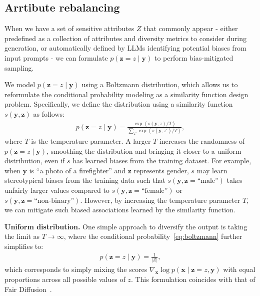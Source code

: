 \subsection{Arrtibute rebalancing}
\label{sec:attribute_rebalancing}
When we have a set of sensitive attributes $Z$ that commonly appear - either predefined as a collection of attributes and diversity metrics to consider during generation, or automatically defined by LLMs identifying potential biases from input prompts - we can formulate $p(\mathbf{z}=z \mid \mathbf{y})$ to perform bias-mitigated sampling.

We model $p(\mathbf{z}=z \mid \mathbf{y})$ using a Boltzmann distribution, which allows us to reformulate the conditional probability modeling as a similarity function design problem. Specifically, we define the distribution using a similarity function $s(\mathbf{y}, \mathbf{z})$ as follows:
\begin{align}
\label{eq:boltzmann}
p(\mathbf{z} = z \mid \mathbf{y}) = \frac{\exp \left( {s(\mathbf{y}, z)}/{T} \right)}{\sum_{z'} \exp \left( {s(\mathbf{y}, z')}/{T} \right)},
\end{align}
where $T$ is the temperature parameter. A larger $T$ increases the randomness of $p(\mathbf{z} = z \mid \mathbf{y})$, smoothing the distribution and bringing it closer to a uniform distribution, even if $s$ has learned biases from the training dataset. For example, when $\mathbf{y}$ is ``a photo of a firefighter'' and $\mathbf{z}$ represents gender, $s$ may learn stereotypical biases from the training data such that $s(\mathbf{y}, \mathbf{z}=\text{``male''})$ takes unfairly larger values compared to $s(\mathbf{y}, \mathbf{z}=\text{``female''})$ or $s(\mathbf{y}, \mathbf{z}=\text{``non-binary''})$. However, by increasing the temperature parameter $T$, we can mitigate such biased associations learned by the similarity function.

\noindent \textbf{Uniform distribution.} 
One simple approach to diversify the output is taking the limit as $T \to \infty$, where the conditional probability~\eqref{eq:boltzmann} further simplifies to:
\begin{align}
    p(\mathbf{z} = z \mid \mathbf{y}) = \frac{1}{|Z|},
\end{align}
which corresponds to simply mixing the scores $\nabla_{\mathbf{x}} \log p(\mathbf{x}\mid \mathbf{z}=z, \mathbf{y})$ with equal proportions across all possible values of $z$. This formulation coincides with that of Fair Diffusion~\cite{friedrich2023fair}.

